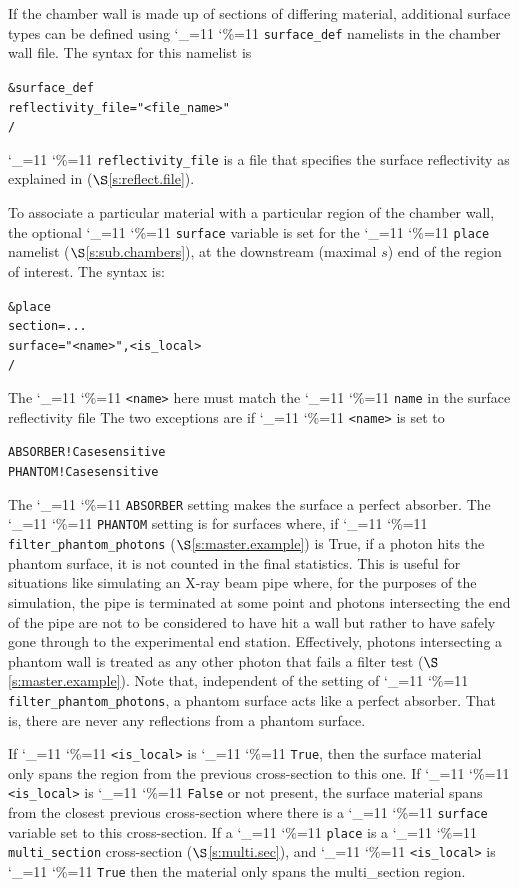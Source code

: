 \documentclass[11pt,openany]{report}
\newcommand{\sref}[1]{$\S$\ref{#1}}
\newcommand\ttcmd{\begingroup\catcode`\_=11 \catcode`\%=11 \dottcmd}
\newcommand\dottcmd[1]{\texttt{#1}\endgroup}
\newcommand{\vn}{\ttcmd}
\newlength{\ExBeg}
\newlength{\ExEnd}
\newenvironment{example}
  {\vspace{\ExBeg} \begin{alltt}}
  {\end{alltt} \vspace{\ExEnd}}
\begin{document}
If the chamber wall is made up of sections of differing material,
additional surface types can be defined using \vn{surface_def}
namelists in the chamber wall file. The syntax for this namelist is
\begin{example}
  &surface_def
    reflectivity_file = "<file_name>"
  / 
\end{example}
\vn{reflectivity_file} is a file that specifies the surface reflectivity as 
explained in (\sref{s:reflect.file}).

To associate a particular material with a particular region of the
chamber wall, the optional \vn{surface} variable is set for the
\vn{place} namelist (\sref{s:sub.chambers}), at the downstream
(maximal $s$) end of the region of interest. The syntax is:
\begin{example}
  &place
    section = ...
    surface  = "<name>", <is_local>
  /
\end{example}
The \vn{<name>} here must match the \vn{name} in the surface reflectivity file The two
exceptions are if \vn{<name>} is set to
\begin{example}
  ABSORBER              ! Case sensitive
  PHANTOM               ! Case sensitive
\end{example}
The \vn{ABSORBER} setting makes the surface a perfect absorber. The \vn{PHANTOM} setting
is for surfaces where, if \vn{filter_phantom_photons} (\sref{s:master.example}) is True,
if a photon hits the phantom surface, it is not counted in the final statistics. This is
useful for situations like simulating an X-ray beam pipe where, for the purposes of the
simulation, the pipe is terminated at some point and photons intersecting the end of the
pipe are not to be considered to have hit a wall but rather to have safely gone through to
the experimental end station. Effectively, photons intersecting a phantom wall is treated
as any other photon that fails a filter test (\sref{s:master.example}). Note that,
independent of the setting of \vn{filter_phantom_photons}, a phantom surface acts like a
perfect absorber. That is, there are never any reflections from a phantom surface.

If \vn{<is_local>} is \vn{True}, then the surface material only spans the region from the
previous cross-section to this one. If \vn{<is_local>} is \vn{False} or not present, the
surface material spans from the closest previous cross-section where there is a
\vn{surface} variable set to this cross-section.  If a \vn{place} is a \vn{multi_section}
cross-section (\sref{s:multi.sec}), and \vn{<is_local>} is \vn{True} then the material
only spans the multi_section region.
\end{document}
